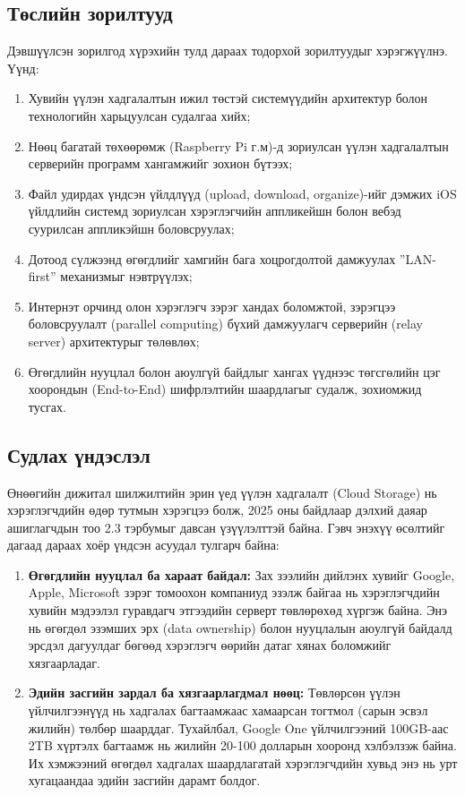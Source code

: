     \subsection*{Төслийн зорилтууд}
        Дэвшүүлсэн зорилгод хүрэхийн тулд дараах тодорхой зорилтуудыг хэрэгжүүлнэ. Үүнд:
        \begin{enumerate}[nosep]
            \item Хувийн үүлэн хадгалалтын ижил төстэй системүүдийн архитектур болон технологийн харьцуулсан судалгаа хийх;
            \item Нөөц багатай төхөөрөмж (Raspberry Pi г.м)-д зориулсан үүлэн хадгалалтын серверийн программ хангамжийг зохион бүтээх;
            \item Файл удирдах үндсэн үйлдлүүд (upload, download, organize)-ийг дэмжих iOS үйлдлийн системд зориулсан хэрэглэгчийн аппликейшн болон вебэд суурилсан аппликэйшн боловсруулах;
            \item Дотоод сүлжээнд өгөгдлийг хамгийн бага хоцрогдолтой дамжуулах ''LAN-first'' механизмыг нэвтрүүлэх;
            \item Интернэт орчинд олон хэрэглэгч зэрэг хандах боломжтой, зэрэгцээ боловсруулалт (parallel computing) бүхий дамжуулагч серверийн (relay server) архитектурыг төлөвлөх;
            \item Өгөгдлийн нууцлал болон аюулгүй байдлыг хангах үүднээс төгсгөлийн цэг хоорондын (End-to-End) шифрлэлтийн шаардлагыг судалж, зохиомжид тусгах.
        \end{enumerate}

    \subsection*{Судлах үндэслэл}
        Өнөөгийн дижитал шилжилтийн эрин үед үүлэн хадгалалт (Cloud Storage) нь хэрэглэгчдийн өдөр тутмын хэрэгцээ болж, 2025 оны байдлаар дэлхий даяар ашиглагчдын тоо 2.3 тэрбумыг \cite{cloudstorageusage} давсан үзүүлэлттэй байна. Гэвч энэхүү өсөлтийг дагаад дараах хоёр үндсэн асуудал тулгарч байна:

        \begin{enumerate}
            \item \textbf{Өгөгдлийн нууцлал ба хараат байдал:}
            Зах зээлийн дийлэнх хувийг Google, Apple, Microsoft зэрэг томоохон компаниуд эзэлж байгаа нь хэрэглэгчдийн хувийн мэдээлэл гуравдагч этгээдийн серверт төвлөрөхөд хүргэж байна. Энэ нь өгөгдөл эзэмших эрх (data ownership) болон нууцлалын аюулгүй байдалд эрсдэл дагуулдаг бөгөөд хэрэглэгч өөрийн датаг хянах боломжийг хязгаарладаг.
            \item \textbf{Эдийн засгийн зардал ба хязгаарлагдмал нөөц:}
            Төвлөрсөн үүлэн үйлчилгээнүүд нь хадгалах багтаамжаас хамаарсан тогтмол (сарын эсвэл жилийн) төлбөр шаарддаг. Тухайлбал, Google One үйлчилгээний 100GB-аас 2TB хүртэлх багтаамж нь жилийн 20-100 долларын хооронд хэлбэлзэж байна. Их хэмжээний өгөгдөл хадгалах шаардлагатай хэрэглэгчдийн хувьд энэ нь урт хугацаандаа эдийн засгийн дарамт болдог.
        \end{enumerate}

